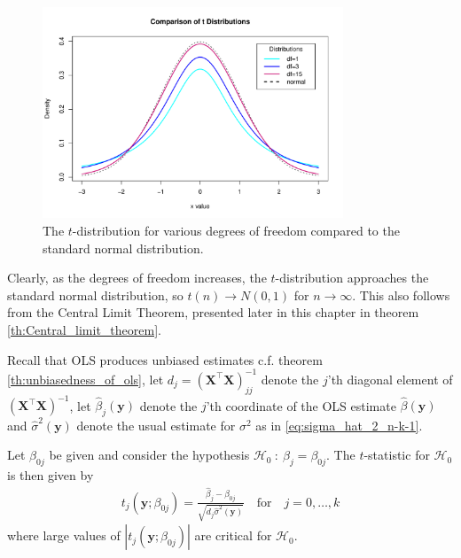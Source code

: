 \begin{figure}[H]
    \centering
    \includegraphics[width = 0.8\textwidth]{figures/t_distribution.pdf}
    \caption{The $t$-distribution for various degrees of freedom compared to the standard normal distribution.}
    \label{fig:t_distribution}
\end{figure}

Clearly, as the degrees of freedom increases, the $t$-distribution approaches the standard normal distribution, so $t(n) \rightarrow N(0,1)$ for $n\rightarrow \infty$. This also follows from the Central Limit Theorem, presented later in this chapter in theorem \ref{th:Central_limit_theorem}. 

Recall that OLS produces unbiased estimates c.f.$\!$ theorem \ref{th:unbiasedness_of_ols}, let $d_j=(\textbf{X}^\top\textbf{X})^{-1}_{jj}$ denote the $j$'th diagonal element of $(\textbf{X}^\top \textbf{X})^{-1}$, let $\hat{\beta}_j(\textbf{y})$ denote the $j$'th coordinate of the OLS estimate $\hat{\beta}(\textbf{y})$ and $\hat{\sigma}^2(\textbf{y})$ denote the usual estimate for $\sigma^2$ as in \eqref{eq:sigma_hat_2_n-k-1}.

\begin{definition} [$t$-statistic] \label{def:t-test}
    Let $\beta_{0j}$ be given and consider the hypothesis $\mathcal{H}_0 \ : \ \beta_j=\beta_{0j}$. 
    The $t$-statistic for $\mathcal{H}_0$ is then given by
\begin{align}\label{eq:t_test1}
   t_j(\textbf{y};\beta_{0j}) = \frac{\hat{\beta}_j - \beta_{0j}}{\sqrt{d_j\hat{\sigma}^2(\textbf{y})}} \quad \text{for} \quad j=0,\ldots,k
\end{align}
where large values of $|t_j(\textbf{y};\beta_{0j})|$ are critical for $\mathcal{H}_0$.
\end{definition}

